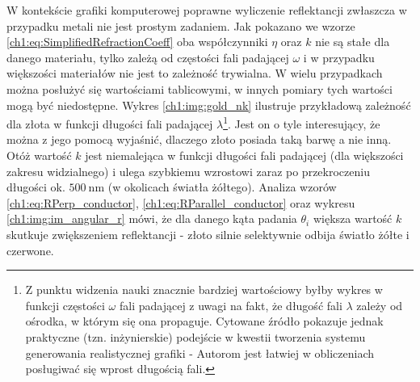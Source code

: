 W kontekście grafiki komputerowej poprawne wyliczenie reflektancji zwłaszcza w przypadku metali nie jest prostym zadaniem. Jak pokazano we wzorze \eqref{ch1:eq:SimplifiedRefractionCoeff} oba współczynniki $\eta$ oraz $k$ nie są stałe dla danego materiału, tylko zależą od częstości fali padającej $\omega$ i w przypadku większości materiałów nie jest to zależność trywialna. W wielu przypadkach można posłużyć się wartościami tablicowymi, w innych pomiary tych wartości mogą być niedostępne. Wykres \ref{ch1:img:gold_nk} ilustruje przykładową zależność dla złota w funkcji długości fali padającej $\lambda$\footnote{Z punktu widzenia nauki znacznie bardziej wartościowy byłby wykres w funkcji częstości $\omega$ fali padającej z uwagi na fakt, że długość fali $\lambda$ zależy od ośrodka, w którym się ona propaguje. Cytowane źródło pokazuje jednak praktyczne (tzn. inżynierskie) podejście w kwestii tworzenia systemu generowania realistycznej grafiki - Autorom jest łatwiej w obliczeniach posługiwać się wprost długością fali. }. Jest on o tyle interesujący, że można z jego pomocą wyjaśnić, dlaczego złoto posiada taką barwę a nie inną. Otóż wartość $k$ jest niemalejąca w funkcji długości fali padającej (dla większości zakresu widzialnego) i ulega szybkiemu wzrostowi zaraz po przekroczeniu długości ok. $500\ \mathrm{nm}$ (w okolicach światła żółtego). Analiza wzorów \eqref{ch1:eq:RPerp_conductor}, \eqref{ch1:eq:RParallel_conductor} oraz wykresu \ref{ch1:img:im_angular_r} mówi, że dla danego kąta padania $\theta_i$ większa wartość $k$ skutkuje zwiększeniem reflektancji - złoto silnie selektywnie odbija światło żółte i czerwone.




